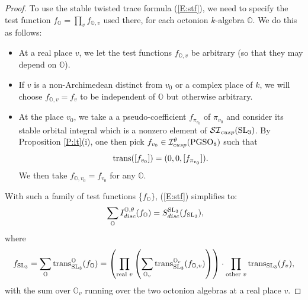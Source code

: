 \documentclass[11pt]{amsart}
\theoremstyle{plain}
\numberwithin{equation}{section}
\def\SL{{\rm SL}}
\def\PGSO{{\rm PGSO}}
\begin{document}
\begin{proof}
 
  
   To use the stable twisted trace formula  (\ref{E:stf}), we need to specify the test function $f_{\mathbb{O}} = \prod_v f_{\mathbb{O},v}$ used there, for each octonion $k$-algebra $\mathbb{O}$. We do this as follows:
   
   \vskip 5pt
\begin{itemize}
\item  At a real place $v$, we let the test functions $f_{\mathbb{O},v}$ be arbitrary (so that they may depend on $\mathbb{O}$). 
\vskip 5pt

\item If $v$ is a non-Archimedean distinct from $v_0$ or a complex  place of $k$, we will choose $f_{\mathbb{O},v} = f_v$ to be independent of $\mathbb{O}$ but otherwise arbitrary.
\vskip 5pt

\item  At the place $v_0$,  we take a a pseudo-coefficient $f_{\pi_{v_0}}$ of $\pi_{v_0}$ and consider its stable orbital  integral  which is a nonzero element of 
$\mathcal{SI}_{cusp}(\SL_3)$. By Proposition \ref{P:lt}(i), one then pick $f_{v_0}  \in  \mathcal{I}^{\theta}_{cusp}(\PGSO_8)$ such that 
\begin{equation}  \label{E:transfer}
 {\rm trans}([f_{v_0}])  = (0 ,0, [f_{\pi_{v_0}}]). \end{equation}
We then take $f_{\mathbb{O}, v_0} = f_{v_0}$ for any $\mathbb{O}$.
 \end{itemize}
\vskip 5pt

With such a family of test functions  \{$f_{\mathbb{O}} \}$, (\ref{E:stf}) simplifies to:
\begin{equation} \label{E:STF1}\
 \sum_{\mathbb{O}} I^{\mathbb{O}, \theta}_{disc}(f_{\mathbb{O}})  =   S_{disc}^{\SL_3}(f_{\SL_3}), \end{equation}
where
\[  f_{\SL_3} = \sum_{\mathbb{O}} {\rm trans}^{\mathbb{O}}_{\SL_3} ( f_{\mathbb{O}}) = \left(   \prod_{\text{real $v$}} \left( \sum_{\mathbb{O}_v}  {\rm trans}^{\mathbb{O}_v}_{\SL_3}(f_{\mathbb{O},v}) \right) \right)  \cdot \prod_{\text{other $v$}}  {\rm trans}_{\SL_3} ( f_v),
 \]
with the sum over $\mathbb{O}_v$ running over the two octonion algebras at a real place $v$.
\vskip 5pt



\end{proof}
\end{document}
